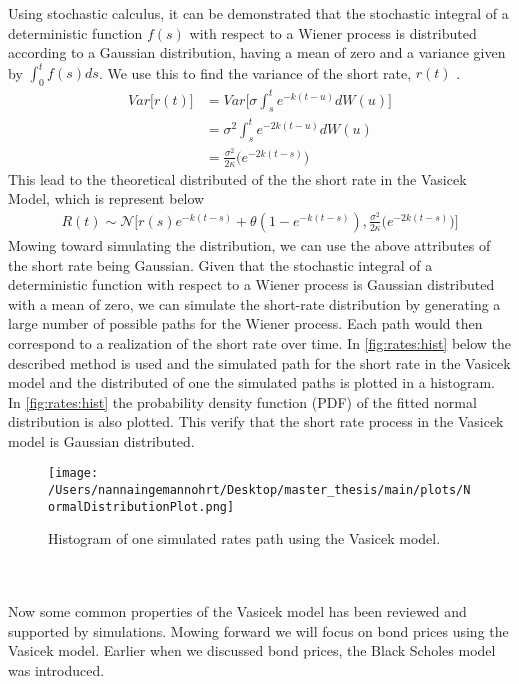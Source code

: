 Using stochastic calculus, it can be demonstrated that the stochastic integral of a deterministic function 
$f(s)$ with respect to a Wiener process is distributed according to a Gaussian distribution,
having a mean of zero and a variance given by $\int_0^t f(s) ds$. We use this to find the variance of the short rate,
$r(t)$ \cite{Bjork}.
\begin{align*}
    Var\Big[r(t)\Big] &= Var\Big[\sigma \int_{s}^{t}e^{-k(t-u)} d W(u) \Big] \\
    &= \sigma^2 \int_{s}^{t}e^{-2k(t-u)} d W(u) \\
    &= \frac{\sigma^2}{2\kappa} \Big(e^{-2k(t-s)}\Big)
    \end{align*}
This lead to the theoretical distributed of the the short rate in the Vasicek Model, which is represent below
\begin{align}
    R(t) \sim \mathcal{N} \Big[ r(s) e^{-k(t-s)} + \theta \left( 1 - e^{-k(t-s)} \right) ,
    \frac{\sigma^2}{2\kappa} \Big(e^{-2k(t-s)}\Big) \Big]
\end{align}
Mowing toward simulating the distribution, we can use the above attributes of the short rate being Gaussian.
Given that the stochastic integral of a deterministic function with respect to a Wiener process is Gaussian distributed
with a mean of zero, we can simulate the short-rate distribution by generating a large number of possible paths
for the Wiener process. Each path would then correspond to a realization of the short rate over time. In \autoref{fig:rates:hist}
below the described method is used and the simulated path for the short rate in the Vasicek model and the distributed of one  the
simulated paths is plotted in a histogram. In \autoref{fig:rates:hist} the probability density function (PDF) of the 
fitted normal distribution is also plotted. This verify that the short rate process in the Vasicek model is Gaussian distributed.
\begin{figure}[h]
    \centering
    \texttt{[image: /Users/nannaingemannohrt/Desktop/master\_thesis/main/plots/NormalDistributionPlot.png]}
    \caption{Histogram of one simulated rates path using the Vasicek model.}
    \label{fig:rates:hist}
\end{figure}
\\\\
\noindent
Now some common properties of the Vasicek model has been reviewed and supported by simulations. Mowing forward we will 
focus on bond prices using the Vasicek model. Earlier when we discussed bond prices, the Black Scholes model was introduced. 
